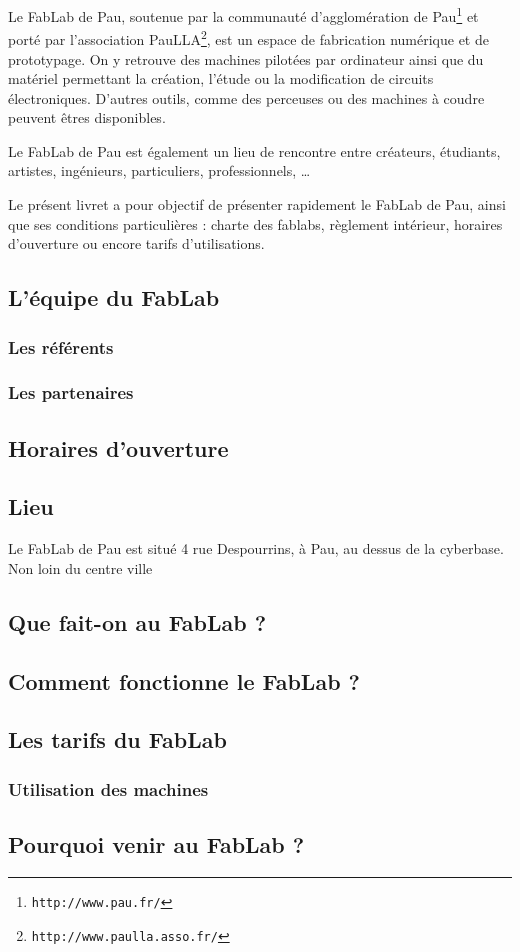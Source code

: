 Le FabLab de Pau, soutenue par la communauté d'agglomération de Pau\footnote{\texttt{http://www.pau.fr/}} et porté par l'association PauLLA\footnote{\texttt{http://www.paulla.asso.fr/}}, est un espace de fabrication numérique et de prototypage. On y retrouve des machines pilotées par ordinateur ainsi que du matériel permettant la création, l'étude  ou la modification de circuits électroniques. D'autres outils, comme des perceuses ou des machines à coudre peuvent êtres disponibles.

Le FabLab de Pau est également un lieu de rencontre entre créateurs, étudiants, artistes, ingénieurs, particuliers, professionnels, \dots 



Le présent livret a pour objectif de présenter rapidement le FabLab de Pau, ainsi que ses conditions particulières : charte des fablabs, règlement intérieur, horaires d'ouverture ou encore tarifs d'utilisations.


\subsection{L'équipe du FabLab}
\subsubsection{Les référents}
\subsubsection{Les partenaires}
\subsection{Horaires d'ouverture}
\subsection{Lieu}
Le FabLab de Pau est situé 4 rue Despourrins, à Pau, au dessus de la cyberbase. Non loin du centre ville
\subsection{Que fait-on au FabLab ?}
\subsection{Comment fonctionne le FabLab ?}

\subsection{Les tarifs du FabLab}

\subsubsection{Utilisation des machines}

\subsection{Pourquoi venir au FabLab ?}
